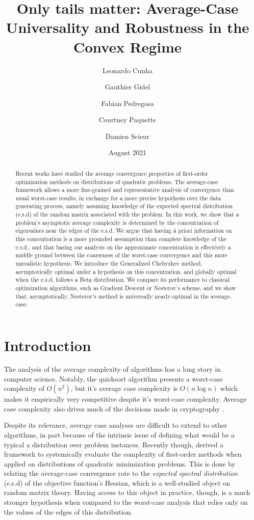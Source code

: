 \documentclass{article}
\title{Only tails matter:
Average-Case Universality and Robustness in the Convex Regime}
\author{Leonardo Cunha
\and Gauthier Gidel \\
\and Fabian Pedregosa \\
\and Courtney Paquette \\
\and Damien Scieur}
\date{August 2021}
\begin{document}
\maketitle
\begin{abstract}
    Recent works have studied the average convergence properties of first-order optimization methods on distributions of quadratic problems. The average-case framework allows a more fine-grained and representative analysis of convergence than usual worst-case results, in exchange for a more precise hypothesis over the data generating process, namely assuming knowledge of the expected spectral distribution (e.s.d) of the random matrix associated with the problem. In this work, we show that a problem's asymptotic average complexity is determined by the concentration of eigenvalues near the edges of the e.s.d. We argue that having à priori information on this concentration is a more grounded assumption than complete knowledge of the e.s.d.,  and that basing our analysis on the approximate concentration is effectively a middle ground between the coarseness of the worst-case convergence and this more unrealistic hypothesis. We introduce the Generalized Chebyshev method, asymptotically optimal under a hypothesis on this concentration, and globally optimal when the e.s.d. follows  a Beta distribution. We compare its performance to classical optimization algorithms, such as Gradient Descent or Nesterov's scheme, and we show that, asymptotically, Nesterov's method is universally nearly-optimal in the average-case.
\end{abstract}
\section{Introduction}


The analysis of the average complexity of algorithms has a long story in computer science. Notably, the quicksort algorithm presents a worst-case complexity of $O(n^2)$, but it's average case complexity is $O(n\log n)$ which makes it  empirically very competitive despite it's worst-case complexity. Average case complexity also drives much of the decisions made in cryptography \citep{bogdanov2006average}.

Despite its relevance, average case analyses are difficult to extend to other algorithms, in part because of the intrinsic issue of defining what would be a typical a distribution over problem instances. Recently though, \cite{pedregosa2020acceleration}  derived a framework to systemically evaluate the complexity of first-order methods when applied on distributions of quadratic minimization problems. This is done by relating the average-case convergence rate to the \textit{expected spectral distribution} (e.s.d) of the objective function's Hessian, which is a well-studied object on random matrix theory. Having access to this object in practice, though, is  a much stronger hypothesis  when compared to the worst-case analysis that relies only on the values of the edges of this distribution. 
\end{document}
